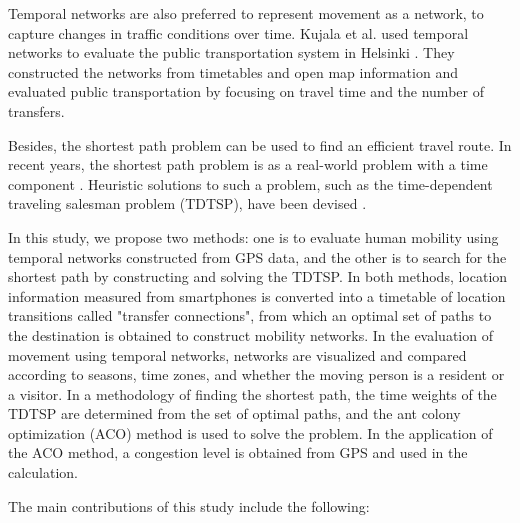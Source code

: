 \documentclass[conference]{IEEEtran}
\begin{document}
Temporal networks are also preferred to represent movement as a network, to capture changes in traffic conditions over time.
Kujala et al. used temporal networks to evaluate the public transportation system in Helsinki \cite{kujala2018travel}.
They constructed the networks from timetables and open map information and evaluated public transportation by focusing on travel time and the number of transfers.
\par Besides, the shortest path problem can be used to find an efficient travel route.
In recent years, the shortest path problem is as a real-world problem with a time component \cite{dorigo2019ant}.
Heuristic solutions to such a problem, such as the time-dependent traveling salesman problem (TDTSP), have been devised \cite{yongqiang2010improved}\cite{fa2019improved}\cite{mavrovouniotis2017pheromone}\cite{mavrovouniotis2016ant}.
\par In this study, we propose two methods: one is to evaluate human mobility using temporal networks constructed from GPS data, and the other is to search for the shortest path by constructing and solving the TDTSP.
In both methods, location information measured from smartphones is converted into a timetable of location transitions called "transfer connections", from which an optimal set of paths to the destination is obtained to construct mobility networks.
In the evaluation of movement using temporal networks, networks are visualized and compared according to seasons, time zones, and whether the moving person is a resident or a visitor.
In a methodology of finding the shortest path, the time weights of the TDTSP are determined from the set of optimal paths, and the ant colony optimization (ACO) method is used to solve the problem.
In the application of the ACO method, a congestion level is obtained from GPS and used in the calculation.
\par The main contributions of this study include the following:
\end{document}
